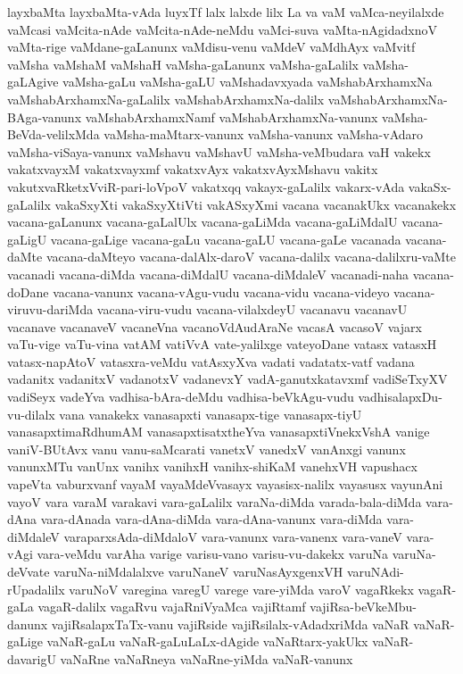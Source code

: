 {layxbaMta
layxbaMta-vAda
luyxTf
lalx
lalxde
lilx
La
va
vaM
vaMca-neyilalxde
vaMcasi
vaMcita-nAde
vaMcita-nAde-neMdu
vaMci-suva
vaMta-nAgidadxnoV
vaMta-rige
vaMdane-gaLanunx
vaMdisu-venu
vaMdeV
vaMdhAyx
vaMvitf
vaMsha
vaMshaM
vaMshaH
vaMsha-gaLanunx
vaMsha-gaLalilx
vaMsha-gaLAgive
vaMsha-gaLu
vaMsha-gaLU
vaMshadavxyada
vaMshabArxhamxNa
vaMshabArxhamxNa-gaLalilx
vaMshabArxhamxNa-dalilx
vaMshabArxhamxNa-BAga-vanunx
vaMshabArxhamxNamf
vaMshabArxhamxNa-vanunx
vaMsha-BeVda-velilxMda
vaMsha-maMtarx-vanunx
vaMsha-vanunx
vaMsha-vAdaro
vaMsha-viSaya-vanunx
vaMshavu
vaMshavU
vaMsha-veMbudara
vaH
vakekx
vakatxvayxM
vakatxvayxmf
vakatxvAyx
vakatxvAyxMshavu
vakitx
vakutxvaRketxVviR-pari-loVpoV
vakatxqq
vakayx-gaLalilx
vakarx-vAda
vakaSx-gaLalilx
vakaSxyXti
vakaSxyXtiVti
vakASxyXmi
vacana
vacanakUkx
vacanakekx
vacana-gaLanunx
vacana-gaLalUlx
vacana-gaLiMda
vacana-gaLiMdalU
vacana-gaLigU
vacana-gaLige
vacana-gaLu
vacana-gaLU
vacana-gaLe
vacanada
vacana-daMte
vacana-daMteyo
vacana-dalAlx-daroV
vacana-dalilx
vacana-dalilxru-vaMte
vacanadi
vacana-diMda
vacana-diMdalU
vacana-diMdaleV
vacanadi-naha
vacana-doDane
vacana-vanunx
vacana-vAgu-vudu
vacana-vidu
vacana-videyo
vacana-viruvu-dariMda
vacana-viru-vudu
vacana-vilalxdeyU
vacanavu
vacanavU
vacanave
vacanaveV
vacaneVna
vacanoVdAudAraNe
vacasA
vacasoV
vajarx
vaTu-vige
vaTu-vina
vatAM
vatiVvA
vate-yalilxge
vateyoDane
vatasx
vatasxH
vatasx-napAtoV
vatasxra-veMdu
vatAsxyXva
vadati
vadatatx-vatf
vadana
vadanitx
vadanitxV
vadanotxV
vadanevxY
vadA-ganutxkatavxmf
vadiSeTxyXV
vadiSeyx
vadeYva
vadhisa-bAra-deMdu
vadhisa-beVkAgu-vudu
vadhisalapxDu-vu-dilalx
vana
vanakekx
vanasapxti
vanasapx-tige
vanasapx-tiyU
vanasapxtimaRdhumAM
vanasapxtisatxtheYva
vanasapxtiVnekxVshA
vanige
vaniV-BUtAvx
vanu
vanu-saMcarati
vanetxV
vanedxV
vanAnxgi
vanunx
vanunxMTu
vanUnx
vanihx
vanihxH
vanihx-shiKaM
vanehxVH
vapushacx
vapeVta
vaburxvanf
vayaM
vayaMdeVvasayx
vayasisx-nalilx
vayasusx
vayunAni
vayoV
vara
varaM
varakavi
vara-gaLalilx
varaNa-diMda
varada-bala-diMda
vara-dAna
vara-dAnada
vara-dAna-diMda
vara-dAna-vanunx
vara-diMda
vara-diMdaleV
varaparxsAda-diMdaloV
vara-vanunx
vara-vanenx
vara-vaneV
vara-vAgi
vara-veMdu
varAha
varige
varisu-vano
varisu-vu-dakekx
varuNa
varuNa-deVvate
varuNa-niMdalalxve
varuNaneV
varuNasAyxgenxVH
varuNAdi-rUpadalilx
varuNoV
varegina
varegU
varege
vare-yiMda
varoV
vagaRkekx
vagaR-gaLa
vagaR-dalilx
vagaRvu
vajaRniVyaMca
vajiRtamf
vajiRsa-beVkeMbu-danunx
vajiRsalapxTaTx-vanu
vajiRside
vajiRsilalx-vAdadxriMda
vaNaR
vaNaR-gaLige
vaNaR-gaLu
vaNaR-gaLuLaLx-dAgide
vaNaRtarx-yakUkx
vaNaR-davarigU
vaNaRne
vaNaRneya
vaNaRne-yiMda
vaNaR-vanunx
}
